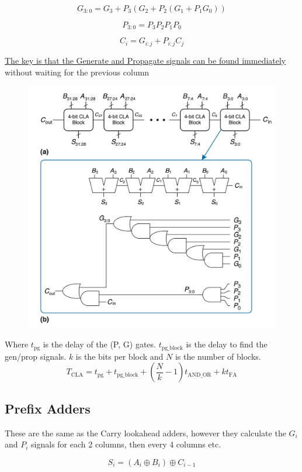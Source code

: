 \documentclass[12pt]{report}
\begin{document}
\[
  G_{3:0} = G_3 + P_3 (G_2 + P_2 (G_1 + P_1 G_0))
\]

\[
  P_{3:0} = P_3 P_2 P_1 P_0
\]

\[
  \boxed{C_i = G_{i:j} + P_{i:j}C_j}
\]

\underline{The key is that the Generate and Propagate signals can be found immediately}
without waiting for the previous column

\begin{figure}[h!]
  \centering
  \includegraphics[width=.5\textwidth]{Carry-lookahead.png}
\end{figure}

Where $t_{\mathrm{pg}}$ is the delay of the (P, G) gates. $t_{\mathrm{pg\_block}}$ is the delay to find the gen/prop signals. $k$ is the bits per block and $N$ is the number of blocks.
\[
  T_{\mathrm{CLA}} = t_{\mathrm{pg}} + t_{\mathrm{pg\_block}} + \left( \frac{N}{k} - 1 \right)t_{\mathrm{AND\_OR}} + kt_{\mathrm{FA}}
\]

\subsection{Prefix Adders}
These are the same as the Carry lookahead adders, however they calculate the $G_i$ and $P_i$ signals for each 2 columns, then every 4 columns etc.

\[
  {S}_{i}=(A_{i}\oplus B_{i})\oplus{C}_{i-1}
\]
\end{document}
